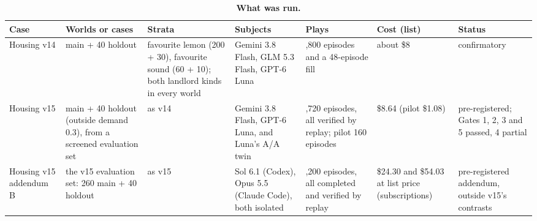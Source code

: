 \renewcommand{\thetable}{E.2}
\begin{longtable}[]{@{}
  >{\raggedright\arraybackslash}p{}
  >{\raggedright\arraybackslash}p{}
  >{\raggedright\arraybackslash}p{}
  >{\raggedright\arraybackslash}p{}
  >{\raggedright\arraybackslash}p{}
  >{\raggedright\arraybackslash}p{}
  >{\raggedright\arraybackslash}p{}@{}}
\caption{\textbf{What was run.}}\label{tab:E.2}\tabularnewline
\toprule\noalign{}
\begin{minipage}[b]{\linewidth}\raggedright
Case
\end{minipage} & \begin{minipage}[b]{\linewidth}\raggedright
Worlds or cases
\end{minipage} & \begin{minipage}[b]{\linewidth}\raggedright
Strata
\end{minipage} & \begin{minipage}[b]{\linewidth}\raggedright
Subjects
\end{minipage} & \begin{minipage}[b]{\linewidth}\raggedright
Plays
\end{minipage} & \begin{minipage}[b]{\linewidth}\raggedright
Cost (list)
\end{minipage} & \begin{minipage}[b]{\linewidth}\raggedright
Status
\end{minipage} \\
\midrule\noalign{}
\endhead
\bottomrule\noalign{}
\endlastfoot
Housing v14 & 260 main + 40 holdout & favourite lemon (200 + 30), favourite sound (60 + 10); both landlord kinds in every world & Gemini 3.8 Flash, GLM 5.3 Flash, GPT-6 Luna & 1,800 episodes and a 48-episode fill & about \$8 & confirmatory \\
Housing v15 & 260 main + 40 holdout (outside demand 0.3), from a screened evaluation set & as v14 & Gemini 3.8 Flash, GPT-6 Luna, and Luna's A/A twin & 1,720 episodes, all verified by replay; pilot 160 episodes & \$8.64 (pilot \$1.08) & pre-registered; Gates 1, 2, 3 and 5 passed, 4 partial \\
Housing v15 addendum B & the v15 evaluation set: 260 main + 40 holdout & as v15 & Sol 6.1 (Codex), Opus 5.5 (Claude Code), both isolated & 1,200 episodes, all completed and verified by replay & \$24.30 and \$54.03 at list price (subscriptions) & pre-registered addendum, outside v15's contrasts \\

\end{longtable}
